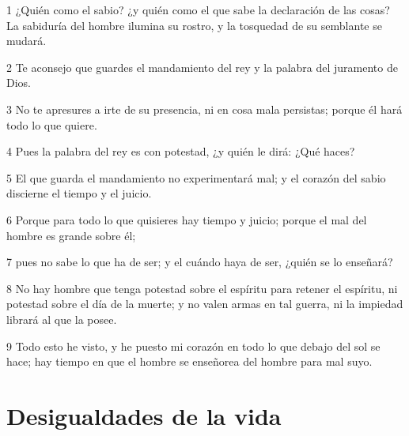 \par 1 ¿Quién como el sabio? ¿y quién como el que sabe la declaración de las cosas? La sabiduría del hombre ilumina su rostro, y la tosquedad de su semblante se mudará.
\par 2 Te aconsejo que guardes el mandamiento del rey y la palabra del juramento de Dios.
\par 3 No te apresures a irte de su presencia, ni en cosa mala persistas; porque él hará todo lo que quiere.
\par 4 Pues la palabra del rey es con potestad, ¿y quién le dirá: ¿Qué haces?
\par 5 El que guarda el mandamiento no experimentará mal; y el corazón del sabio discierne el tiempo y el juicio.
\par 6 Porque para todo lo que quisieres hay tiempo y juicio; porque el mal del hombre es grande sobre él;
\par 7 pues no sabe lo que ha de ser; y el cuándo haya de ser, ¿quién se lo enseñará?
\par 8 No hay hombre que tenga potestad sobre el espíritu para retener el espíritu, ni potestad sobre el día de la muerte; y no valen armas en tal guerra, ni la impiedad librará al que la posee.
\par 9 Todo esto he visto, y he puesto mi corazón en todo lo que debajo del sol se hace; hay tiempo en que el hombre se enseñorea del hombre para mal suyo.

\section*{Desigualdades de la vida}

